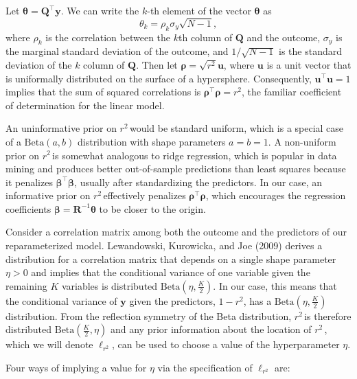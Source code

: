 \documentclass[11pt]{article}
\newcommand{\Rsq}{$r^2\,$}
\newcommand{\boldrho}{\boldsymbol{\rho}}
\newcommand{\boldbeta}{\boldsymbol{\beta}}
\newcommand{\boldtheta}{\boldsymbol{\theta}}
\newcommand{\y}{\mathbf{y}}
\newcommand{\Q}{\mathbf{Q}}
\newcommand{\R}{\mathbf{R}}
\renewcommand{\u}{\mathbf{u}}
\newcommand{\locRsq}{\ell_{r^2}}
\newcommand{\halfK}{\frac{K}{2}}
\newcommand{\Betadist}[2]{\mathrm{Beta}\left(#1,#2\right)}
\begin{document}
Let $\boldtheta = \Q^\top \y$. We can write the $k$-th element of the vector
$\boldtheta$ as
$$\theta_k = \rho_k \sigma_y \sqrt{N - 1},$$
where $\rho_k$ is the correlation between the $k$th column of $\Q$ and the
outcome, $\sigma_y$ is the marginal standard deviation of the outcome, and
$1/\sqrt{N-1}$ is the standard deviation of the $k$ column of $\Q$. Then let
$\boldrho = \sqrt{r^2}\u$, where $\u$ is a unit vector that is
uniformally distributed on the surface of a hypersphere. Consequently,
$\u^\top \u = 1$ implies that the sum of squared correlations is
$\boldrho^\top \boldrho = r^2$, the familiar coefficient of determination for
the linear model.

An uninformative prior on \Rsq would be standard uniform, which is a special
case of a $\Betadist{a}{b}$ distribution with shape parameters $a = b = 1$.
A non-uniform prior on \Rsq is somewhat analogous to ridge
regression, which is popular in data mining and produces better out-of-sample
predictions than least squares because it penalizes $\boldbeta^\top \boldbeta$,
usually after standardizing the predictors. In our case, an informative prior on
\Rsq effectively penalizes $\boldrho^\top \boldrho$, which encourages the
regression coefficients $\boldbeta = \R^{-1} \boldtheta$ to be closer to the
origin.

Consider a correlation matrix among both the outcome and the predictors of
our reparameterized model. Lewandowski, Kurowicka, and Joe (2009) derives a
distribution for a correlation matrix that depends on a single shape parameter
$\eta > 0$ and implies that the conditional variance of one variable given the
remaining $K$ variables is distributed $\Betadist{\eta}{\halfK}$. In our case,
this means that the conditional variance of $\y$ given the predictors,
$1 - r^2$, has a $\Betadist{\eta}{\halfK}$ distribution. From the
reflection symmetry of the Beta distribution, \Rsq is therefore distributed
$\Betadist{\halfK}{\eta}$ and any prior information about the location of \Rsq,
which we will denote $\locRsq$, can be used to choose a value of the
hyperparameter $\eta$.

Four ways of implying a value for $\eta$ via the specification of $\locRsq$ are:
\end{document}
